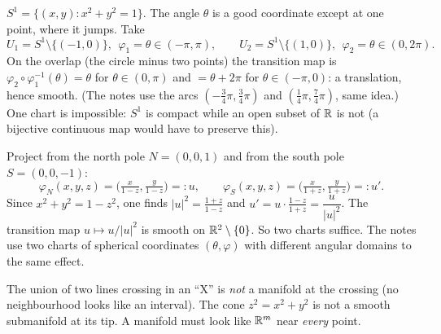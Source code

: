 \begin{example}
$S^1=\{(x,y):x^2+y^2=1\}$. The angle $\theta$ is a good coordinate except at one point, where it jumps. Take
\[
U_1=S^1\setminus\{(-1,0)\},\ \ \varphi_1=\theta\in(-\pi,\pi),\qquad
U_2=S^1\setminus\{(1,0)\},\ \ \varphi_2=\theta\in(0,2\pi).
\]
On the overlap (the circle minus two points) the transition map is $\varphi_2\circ\varphi_1^{-1}(\theta)=\theta$ for $\theta\in(0,\pi)$ and $=\theta+2\pi$ for $\theta\in(-\pi,0)$: a translation, hence smooth. (The notes use the arcs $(-\tfrac34\pi,\tfrac34\pi)$ and $(\tfrac14\pi,\tfrac74\pi)$, same idea.) One chart is impossible: $S^1$ is compact while an open subset of $\mathbb{R}$ is not (a bijective continuous map would have to preserve this).
\end{example}

\begin{example}
Project from the north pole $N=(0,0,1)$ and from the south pole $S=(0,0,-1)$:
\[
\varphi_N(x,y,z)=\Big(\tfrac{x}{1-z},\tfrac{y}{1-z}\Big)=:u,\qquad
\varphi_S(x,y,z)=\Big(\tfrac{x}{1+z},\tfrac{y}{1+z}\Big)=:u'.
\]
Since $x^2+y^2=1-z^2$, one finds $|u|^2=\frac{1+z}{1-z}$ and $u'=u\cdot\frac{1-z}{1+z}=\dfrac{u}{|u|^2}$.
The transition map $u\mapsto u/|u|^2$ is smooth on $\mathbb{R}^2\setminus\{0\}$. So two charts suffice. The notes use two charts of spherical coordinates $(\theta,\varphi)$ with different angular domains to the same effect.
\end{example}

\begin{pitfall}
The union of two lines crossing in an ``X'' is \emph{not} a manifold at the crossing (no neighbourhood looks like an interval). The cone $z^2=x^2+y^2$ is not a smooth submanifold at its tip. A manifold must look like $\mathbb{R}^m$ near \emph{every} point.
\end{pitfall}
